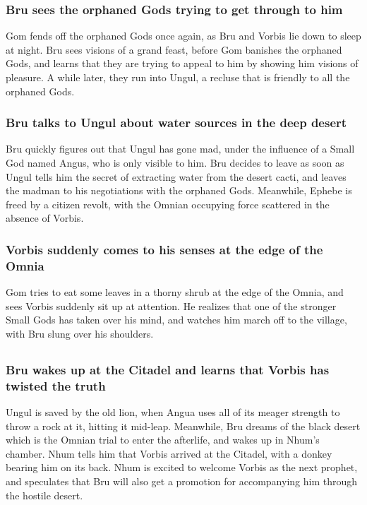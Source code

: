 \subsubsection{\Gls{Bru} sees the orphaned Gods trying to get through to him}
\Gls{Gom} fends off the orphaned Gods once again, as \Gls{Bru} and \Gls{Vorbis} lie down to sleep
at night. \Gls{Bru} sees visions of a grand feast, before \Gls{Gom} banishes the orphaned Gods,
and learns that they are trying to appeal to him by showing him visions of pleasure. A while later,
they run into \Gls{Ungul}, a recluse that is friendly to all the orphaned Gods.

\subsubsection{\Gls{Bru} talks to \Gls{Ungul} about water sources in the deep desert}
\Gls{Bru} quickly figures out that \Gls{Ungul} has gone mad, under the influence of a Small God
named \Gls{Angus}, who is only visible to him. \Gls{Bru} decides to leave as soon as \Gls{Ungul}
tells him the secret of extracting water from the desert cacti, and leaves the madman to his
negotiations with the orphaned Gods. Meanwhile, Ephebe is freed by a citizen revolt, with the
Omnian occupying force scattered in the absence of \Gls{Vorbis}.

\subsubsection{\Gls{Vorbis} suddenly comes to his senses at the edge of the Omnia}
\Gls{Gom} tries to eat some leaves in a thorny shrub at the edge of the Omnia, and sees
\Gls{Vorbis} suddenly sit up at attention. He realizes that one of the stronger Small Gods has
taken over his mind, and watches him march off to the village, with \Gls{Bru} slung over his
shoulders.

\subsection{}
\subsubsection{\Gls{Bru} wakes up at the Citadel and learns that \Gls{Vorbis} has twisted the truth}
\Gls{Ungul} is saved by the old lion, when \Gls{Angua} uses all of its meager strength to throw
a rock at it, hitting it mid-leap. Meanwhile, \Gls{Bru} dreams of the black desert which is the
Omnian trial to enter the afterlife, and wakes up in \Gls{Nhum}'s chamber. \Gls{Nhum} tells him
that \Gls{Vorbis} arrived at the Citadel, with a donkey bearing him on its back. \Gls{Nhum} is
excited to welcome \Gls{Vorbis} as the next prophet, and speculates that \Gls{Bru} will also get a
promotion for accompanying him through the hostile desert.

